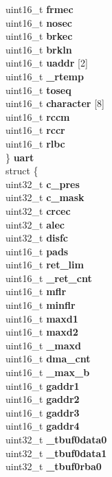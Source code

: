 \begin{DoxyCompactItemize}
\begin{tabbing}
\>\>uint16\_t {\bfseries frmec}\\
\>\>uint16\_t {\bfseries nosec}\\
\>\>uint16\_t {\bfseries brkec}\\
\>\>uint16\_t {\bfseries brkln}\\
\>\>uint16\_t {\bfseries uaddr} \mbox{[}2\mbox{]}\\
\>\>uint16\_t {\bfseries \_rtemp}\\
\>\>uint16\_t {\bfseries toseq}\\
\>\>uint16\_t {\bfseries character} \mbox{[}8\mbox{]}\\
\>\>uint16\_t {\bfseries rccm}\\
\>\>uint16\_t {\bfseries rccr}\\
\>\>uint16\_t {\bfseries rlbc}\\
\>\} {\bfseries uart}\\
\>struct \{\\
\>\>uint32\_t {\bfseries c\_pres}\\
\>\>uint32\_t {\bfseries c\_mask}\\
\>\>uint32\_t {\bfseries crcec}\\
\>\>uint32\_t {\bfseries alec}\\
\>\>uint32\_t {\bfseries disfc}\\
\>\>uint16\_t {\bfseries pads}\\
\>\>uint16\_t {\bfseries ret\_lim}\\
\>\>uint16\_t {\bfseries \_ret\_cnt}\\
\>\>uint16\_t {\bfseries mflr}\\
\>\>uint16\_t {\bfseries minflr}\\
\>\>uint16\_t {\bfseries maxd1}\\
\>\>uint16\_t {\bfseries maxd2}\\
\>\>uint16\_t {\bfseries \_maxd}\\
\>\>uint16\_t {\bfseries dma\_cnt}\\
\>\>uint16\_t {\bfseries \_max\_b}\\
\>\>uint16\_t {\bfseries gaddr1}\\
\>\>uint16\_t {\bfseries gaddr2}\\
\>\>uint16\_t {\bfseries gaddr3}\\
\>\>uint16\_t {\bfseries gaddr4}\\
\>\>uint32\_t {\bfseries \_tbuf0data0}\\
\>\>uint32\_t {\bfseries \_tbuf0data1}\\
\>\>uint32\_t {\bfseries \_tbuf0rba0}\\

\end{tabbing}
\end{DoxyCompactItemize}
